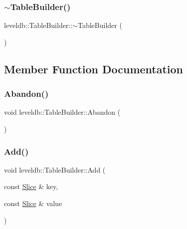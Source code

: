 \subsubsection{\texorpdfstring{$\sim$TableBuilder()}{~TableBuilder()}}
{\footnotesize\ttfamily leveldb\+::\+Table\+Builder\+::$\sim$\+Table\+Builder (\begin{DoxyParamCaption}{ }\end{DoxyParamCaption})}



\subsection{Member Function Documentation}
\mbox{\label{classleveldb_1_1_table_builder_a3b4dded079f960b8624bdfa13d967b94}} 
\subsubsection{\texorpdfstring{Abandon()}{Abandon()}}
{\footnotesize\ttfamily void leveldb\+::\+Table\+Builder\+::\+Abandon (\begin{DoxyParamCaption}{ }\end{DoxyParamCaption})}

\mbox{\label{classleveldb_1_1_table_builder_a37bd347cb6340215475ac9b42dc19d10}} 
\subsubsection{\texorpdfstring{Add()}{Add()}}
{\footnotesize\ttfamily void leveldb\+::\+Table\+Builder\+::\+Add (\begin{DoxyParamCaption}\item[{const \mbox{\hyperlink{classleveldb_1_1_slice}{Slice}} \&}]{key,  }\item[{const \mbox{\hyperlink{classleveldb_1_1_slice}{Slice}} \&}]{value }\end{DoxyParamCaption})}


